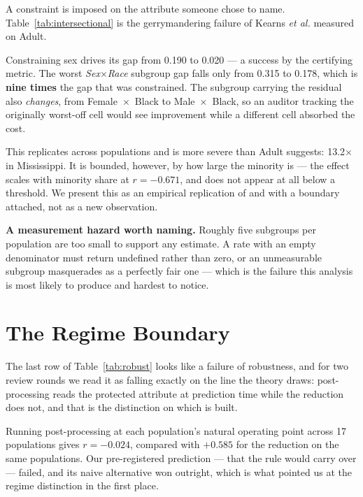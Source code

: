 \documentclass[conference]{IEEEtran}
\begin{document}
A constraint is imposed on the attribute someone chose to name.
Table~\ref{tab:intersectional} is the gerrymandering failure of Kearns \emph{et al.}
\cite{kearns2018} measured on Adult.

Constraining sex drives its gap from 0.190 to 0.020 --- a success by the certifying metric.
The worst \emph{Sex}$\times$\emph{Race} subgroup gap falls only from 0.315 to 0.178, which is
\textbf{nine times} the gap that was constrained. The subgroup carrying the residual also
\emph{changes}, from Female~$\times$~Black to Male~$\times$~Black, so an auditor tracking the
originally worst-off cell would see improvement while a different cell absorbed the cost.

This replicates across populations and is more severe than Adult suggests: 13.2$\times$ in
Mississippi. It is bounded, however, by how large the minority is --- the effect scales with
minority share at $r = -0.671$, and does not appear at all below a threshold. We present this
as an empirical replication of \cite{kearns2018} and \cite{maheshwari2023} with a boundary
attached, not as a new observation.

\textbf{A measurement hazard worth naming.} Roughly five subgroups per population are too small
to support any estimate. A rate with an empty denominator must return undefined rather than
zero, or an unmeasurable subgroup masquerades as a perfectly fair one --- which is the failure
this analysis is most likely to produce and hardest to notice.

\section{The Regime Boundary}
\label{sec:regime}

The last row of Table~\ref{tab:robust} looks like a failure of robustness, and for two
review rounds we read it as falling exactly on the line the theory draws: post-processing
reads the protected attribute at prediction time while the reduction does not, and that
is the distinction on which \cite{backfire2026} is built.

Running post-processing at each population's natural operating point across 17 populations
gives $r = -0.024$, compared with $+0.585$ for the reduction on the same populations. Our
pre-registered prediction --- that the rule would carry over --- failed, and its naive
alternative won outright, which is what pointed us at the regime distinction in the first
place.
\end{document}
